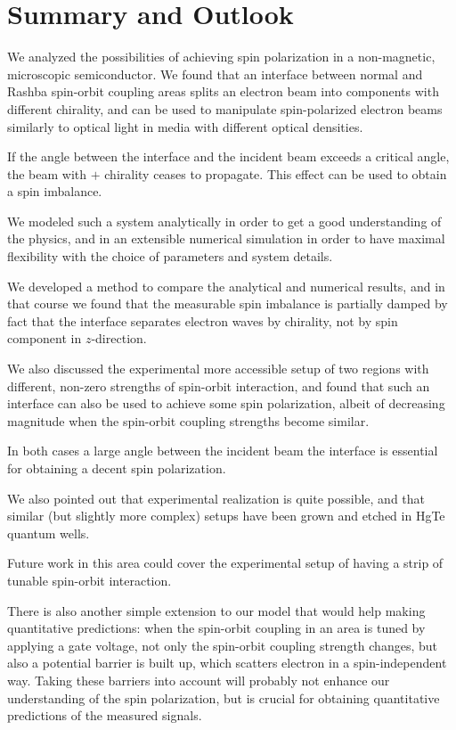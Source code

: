 \chapter{Summary and Outlook}
\label{sec:summary}

We analyzed the possibilities of achieving spin polarization in a
non-magnetic, microscopic semiconductor. We found that an interface between
normal and Rashba spin-orbit coupling areas splits an electron beam into
components with different chirality, and can be used to manipulate
spin-polarized electron beams similarly to optical light in media with
different optical densities.
           
If the angle between the interface
and the incident beam exceeds a critical angle, the beam with $+$ chirality
ceases to propagate. This effect can be used to obtain a spin imbalance.

We modeled such a system analytically in order to get a good understanding
of the physics, and in an extensible numerical simulation in order to have
maximal flexibility with the choice of parameters and system details.

We developed a method to compare the analytical and numerical results, and in
that course we found that the measurable spin imbalance is partially
damped by fact that the interface separates electron waves by chirality,
not by spin component in $z$-direction.

We also discussed the experimental more accessible setup of two regions with
different, non-zero strengths of spin-orbit interaction, and found that such an
interface can also be used to achieve some spin polarization, albeit
of decreasing magnitude when the spin-orbit coupling strengths become similar. 

In both cases a large angle between the incident beam the interface is
essential for obtaining a decent spin polarization.

We also pointed out that experimental realization is quite possible, and that
similar (but slightly more complex) setups have been grown and etched in HgTe
quantum wells.

Future work in this area could cover the experimental setup of having a strip
of tunable spin-orbit interaction.

There is also another simple extension to our model that would help making
quantitative predictions: when the spin-orbit coupling in an area is tuned by
applying a gate voltage, not only the spin-orbit coupling strength changes,
but also a potential barrier is built up, which scatters electron in a
spin-independent way. Taking these barriers into account will probably not
enhance our understanding of the spin polarization, but is crucial for
obtaining quantitative predictions of the measured signals.

